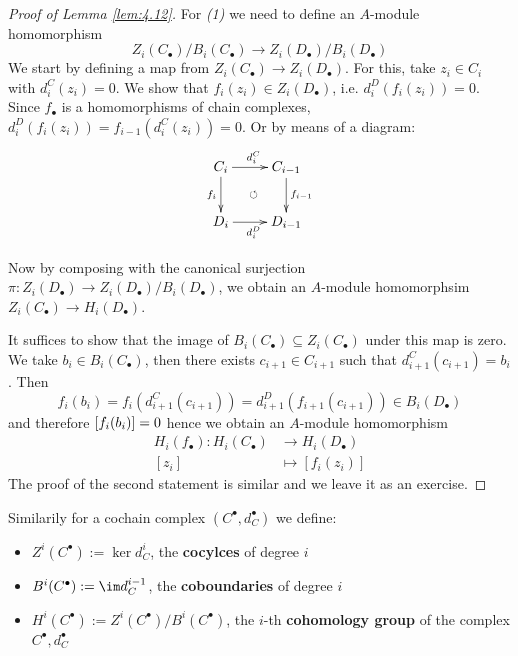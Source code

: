 \documentclass[twoside = false,	%
		headsepline,		%
		parskip = true,
		]{scrbook}						%
\begin{document}
        \begin{proof}[Proof of Lemma \ref{lem:4.12}]
            For \textit{(1)} we need to define an $A$-module homomorphism
            \begin{equation*}
                Z_i(C_\bullet)/B_i(C_\bullet) \to Z_i(D_\bullet)/B_i(D_\bullet)
            \end{equation*}
            We start by defining a map from $Z_i(C_\bullet) \to Z_i(D_\bullet)$. For this, take $z_i \in C_i$ with $d_i^C(z_i) = 0$. We show that $f_i(z_i) \in Z_i(D_\bullet)$, i.e. $d_i^D(f_i(z_i)) = 0$. Since $f_\bullet$ is a homomorphisms of chain complexes, $d_i^D(f_i(z_i)) = f_{i-1}(d_i^C(z_i)) = 0$. Or by means of a diagram:
            \begin{equation*}
            \xymatrix {
                C_i \ar[r]^{d_i^C} \ar[d]_{f_i} & C_{i-1} \ar[d]^{f_{i-1}}\\
                D_i \ar[r]_{d_{i}^D} \ar@{}[ur]|{\circlearrowleft} & D_{i-1}
            }
            \end{equation*}

            Now by composing with the canonical surjection $\pi: Z_i(D_\bullet) \to Z_i(D_\bullet)/B_i(D_\bullet)$, we obtain an $A$-module homomorphsim $Z_i(C_\bullet) \to H_i(D_\bullet)$.

            It suffices to show that the image of $B_i(C_\bullet) \subseteq Z_i(C_\bullet)$ under this map is zero. We take $b_i \in B_i(C_\bullet)$, then there exists $c_{i+1} \in C_{i+1}$ such that $d_{i+1}^C(c_{i+1}) = b_i$. Then
            \begin{equation*}
                f_i(b_i) = f_i(d_{i+1}^C(c_{i+1})) = d_{i+1}^D(f_{i+1}(c_{i+1})) \in B_i(D_\bullet)
            \end{equation*} and therefore $\left[ f_i(b_i)\right] = 0$ hence we obtain an $A$-module homomorphism
            \begin{equation*}
            \begin{split}
                H_i(f_\bullet): H_i(C_\bullet) &\to H_i(D_\bullet) \\ [z_i] &\mapsto [f_i(z_i)] 
            \end{split}
            \end{equation*}
            The proof of the second statement is similar and we leave it as an exercise. 
        \end{proof}

        Similarily for a cochain complex $(C^\bullet,d_C^\bullet)$ we define:
        \begin{itemize}
            \item $Z^i(C^\bullet):= \ker d_C^i$, the \textbf{cocylces} of degree $i$ 
            \item $B^i(C^\bullet):= \im d_C^{i-1}$, the \textbf{coboundaries} of degree $i$
            \item $H^i(C^\bullet):= Z^i(C^\bullet)/B^i(C^\bullet)$, the $i$-th \textbf{cohomology group} of the complex $C^\bullet, d_C^\bullet$
        \end{itemize}
\end{document}
